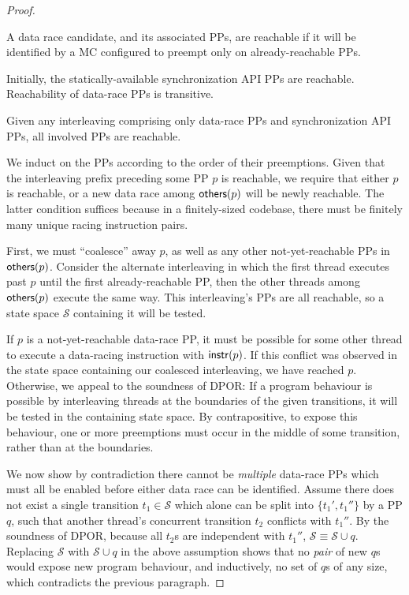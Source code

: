 \begin{proof}
\begin{definition}[Reachability]
A data race candidate, and its associated PPs, are reachable if it will be identified by a MC configured to preempt only on already-reachable PPs.
\end{definition}
Initially, the statically-available synchronization API PPs are reachable. Reachability of data-race PPs is transitive.

\begin{lemma}
	Given any interleaving comprising only data-race PPs and synchronization API PPs, all involved PPs are reachable.
	\label{lem:saturation}
\end{lemma}

We induct on the PPs according to the order of their preemptions.
Given that the interleaving prefix preceding some PP $p$ is reachable,
we require that either $p$ is reachable, or a new data race among $\mathsf{others}(p)$ will be newly reachable. %
The latter condition suffices because in a finitely-sized codebase, there must be finitely many unique racing instruction pairs.

First, we must ``coalesce'' away $p$, as well as any other not-yet-reachable PPs in $\mathsf{others}(p)$.
Consider the alternate interleaving in which the first thread executes past $p$ until the first already-reachable PP,
then the other threads among $\mathsf{others}(p)$ execute the same way.
This interleaving's PPs are all reachable, so a state space $\mathcal{S}$ containing it will be tested.

If $p$ is a not-yet-reachable data-race PP,
it must be possible for some other thread to execute a data-racing instruction with $\mathsf{instr}(p)$.
If this conflict was observed in the state space containing our coalesced interleaving, we have reached $p$.
Otherwise, we appeal to the soundness of DPOR:
If a program behaviour is possible by interleaving threads at the boundaries of the given transitions,
it will be tested in the containing state space.
By contrapositive, to expose this behaviour, one or more preemptions must occur in the middle of some transition, rather than at the boundaries.

We now show by contradiction there cannot be {\em multiple} data-race PPs which must all be enabled before either data race can be identified.
Assume there does not exist a single transition $t_1 \in \mathcal{S}$ which alone can be split into $\{t_1',t_1''\}$ by a PP $q$,
such that another thread's concurrent transition $t_2$ conflicts with $t_1''$.
By the soundness of DPOR, because all $t_2$s are independent with $t_1''$, $\mathcal{S} \equiv \mathcal{S} \cup q$.
Replacing $\mathcal{S}$ with $\mathcal{S} \cup q$ in the above assumption shows that no {\em pair} of new $q$s would expose new program behaviour, and inductively, no set of $q$s of any size, which contradicts the previous paragraph.


\end{proof}
